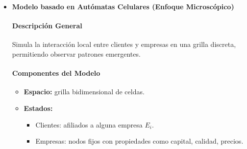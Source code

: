 \documentclass[a4paper,12pt]{article}
\begin{document}
\begin{itemize}
    \paragraph{Condiciones Favorables a Monopolios}
    \begin{itemize}
        \item Rendimientos crecientes con $p \geq 1$
        \item Altas barreras de entrada ($\epsilon_i$ grande)
        \item Innovación vinculada a tamaño ($\beta_i S_i$)
        \item Competencia asimétrica ($c_{ij}$ alto de grandes sobre pequeñas)
    \end{itemize}

    \item \textbf{Modelo basado en Autómatas Celulares (Enfoque Microscópico)}

    \paragraph{Descripción General} Simula la interacción local entre clientes y empresas en una grilla discreta, permitiendo observar patrones emergentes.

    \paragraph{Componentes del Modelo}
    \begin{itemize}
        \item \textbf{Espacio:} grilla bidimensional de celdas.
        \item \textbf{Estados:}
        \begin{itemize}
            \item Clientes: afiliados a alguna empresa $E_i$.
            \item Empresas: nodos fijos con propiedades como capital, calidad, precios.
        \end{itemize}
    \end{itemize}


\end{itemize}
\end{document}
